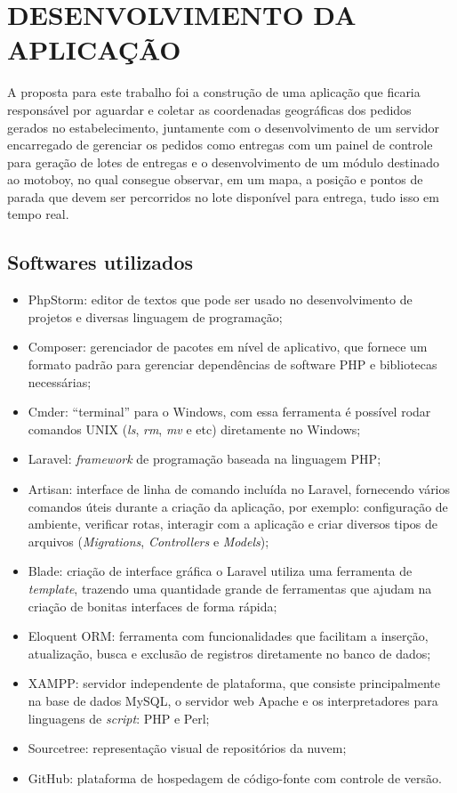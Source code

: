 
\chapter{DESENVOLVIMENTO DA APLICAÇÃO}
A proposta para este trabalho foi a construção de uma aplicação que ficaria responsável
por aguardar e coletar as coordenadas geográficas dos pedidos gerados no estabelecimento,
juntamente com o desenvolvimento de um servidor encarregado de gerenciar os pedidos como entregas
com um painel de controle para geração de lotes de entregas e o desenvolvimento de um módulo destinado ao motoboy, no qual consegue observar, em um mapa, a posição e pontos de parada que devem ser percorridos no lote disponível para entrega, tudo isso em tempo real.

\section{Softwares utilizados}

\begin{itemize}
    \item PhpStorm: editor de textos que pode ser usado no desenvolvimento de projetos e diversas linguagem de programação;
    \item Composer: gerenciador de pacotes em nível de aplicativo, que fornece um formato padrão para gerenciar dependências de software PHP e bibliotecas necessárias;
    \item Cmder: “terminal” para o Windows, com essa ferramenta é possível rodar comandos UNIX (\textit{ls}, \textit{rm}, \textit{mv} e etc) diretamente no Windows;
    \item Laravel: \textit{framework} de programação baseada na linguagem PHP;
    \item Artisan: interface de linha de comando incluída no Laravel, fornecendo vários comandos úteis durante a criação da aplicação, por exemplo: configuração de ambiente, verificar rotas, interagir com a aplicação e criar diversos tipos de arquivos (\textit{Migrations}, \textit{Controllers} e \textit{Models});
    \item Blade: criação de interface gráfica o Laravel utiliza uma ferramenta de \textit{template}, trazendo uma quantidade grande de ferramentas que ajudam na criação de bonitas interfaces de forma rápida;
    \item Eloquent ORM: ferramenta com funcionalidades que facilitam a inserção, atualização, busca e exclusão de registros diretamente no banco de dados;
    \item XAMPP: servidor independente de plataforma, que consiste principalmente na base de dados MySQL, o servidor web Apache e os interpretadores para linguagens de \textit{script}: PHP e Perl;
    \item Sourcetree: representação visual de repositórios da nuvem;
    \item GitHub: plataforma de hospedagem de código-fonte com controle de versão.
\end{itemize}

